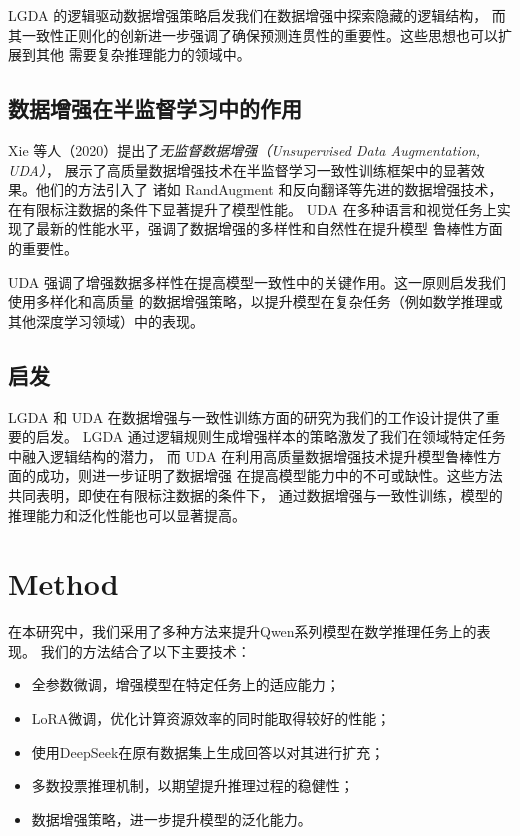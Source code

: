 \documentclass{article}
\begin{document}
LGDA 的逻辑驱动数据增强策略启发我们在数据增强中探索隐藏的逻辑结构，
而其一致性正则化的创新进一步强调了确保预测连贯性的重要性。这些思想也可以扩展到其他
需要复杂推理能力的领域中。

\subsection{数据增强在半监督学习中的作用}
Xie 等人（2020）提出了\textit{无监督数据增强（Unsupervised Data Augmentation, UDA）}，
展示了高质量数据增强技术在半监督学习一致性训练框架中的显著效果。他们的方法引入了
诸如 RandAugment 和反向翻译等先进的数据增强技术，在有限标注数据的条件下显著提升了模型性能。
UDA 在多种语言和视觉任务上实现了最新的性能水平，强调了数据增强的多样性和自然性在提升模型
鲁棒性方面的重要性。

UDA 强调了增强数据多样性在提高模型一致性中的关键作用。这一原则启发我们使用多样化和高质量
的数据增强策略，以提升模型在复杂任务（例如数学推理或其他深度学习领域）中的表现。

\subsection{启发}
LGDA 和 UDA 在数据增强与一致性训练方面的研究为我们的工作设计提供了重要的启发。
LGDA 通过逻辑规则生成增强样本的策略激发了我们在领域特定任务中融入逻辑结构的潜力，
而 UDA 在利用高质量数据增强技术提升模型鲁棒性方面的成功，则进一步证明了数据增强
在提高模型能力中的不可或缺性。这些方法共同表明，即使在有限标注数据的条件下，
通过数据增强与一致性训练，模型的推理能力和泛化性能也可以显著提高。



\section{Method}


\par 在本研究中，我们采用了多种方法来提升Qwen系列模型在数学推理任务上的表现。
我们的方法结合了以下主要技术：
\begin{itemize}
    \item 全参数微调，增强模型在特定任务上的适应能力；
    \item LoRA微调，优化计算资源效率的同时能取得较好的性能；
    \item 使用DeepSeek在原有数据集上生成回答以对其进行扩充；
    \item 多数投票推理机制，以期望提升推理过程的稳健性；
    \item 数据增强策略，进一步提升模型的泛化能力。
\end{itemize}
 
\end{document}
